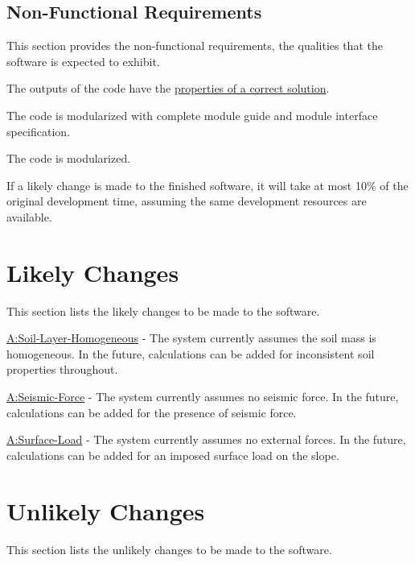 \documentclass[12pt]{article}
\begin{document}
\subsection{Non-Functional Requirements}
\label{Sec:NFRs}
This section provides the non-functional requirements, the qualities that the software is expected to exhibit.

\begin{description}[font=\normalfont]
\item[Correctness:\phantomsection\label{correct}]{The outputs of the code have the \hyperref[Sec:CorSolProps]{properties of a correct solution}.}
\item[Understandability:\phantomsection\label{understandable}]{The code is modularized with complete module guide and module interface specification.}
\item[Reusability:\phantomsection\label{reusable}]{The code is modularized.}
\item[Maintainability:\phantomsection\label{maintainable}]{If a likely change is made to the finished software, it will take at most 10$\%$ of the original development time, assuming the same development resources are available.}
\end{description}
\section{Likely Changes}
\label{Sec:LCs}
This section lists the likely changes to be made to the software.

\begin{description}[font=\normalfont]
\item[Calculate-Inhomogeneous-Soil-Layers:\phantomsection\label{LC_inhomogeneous}]{\hyperref[assumpSLH]{A:Soil-Layer-Homogeneous} - The system currently assumes the soil mass is homogeneous. In the future, calculations can be added for inconsistent soil properties throughout.}
\item[Calculate-Seismic-Force:\phantomsection\label{LC_seismic}]{\hyperref[assumpSF]{A:Seismic-Force} - The system currently assumes no seismic force. In the future, calculations can be added for the presence of seismic force.}
\item[Calculate-External-Force:\phantomsection\label{LC_external}]{\hyperref[assumpSL]{A:Surface-Load} - The system currently assumes no external forces. In the future, calculations can be added for an imposed surface load on the slope.}
\end{description}
\section{Unlikely Changes}
\label{Sec:UCs}
This section lists the unlikely changes to be made to the software.
\end{document}

